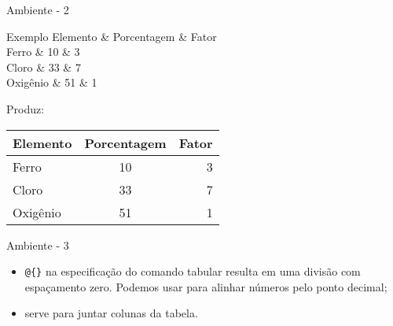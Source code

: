 \begin{frame}{Ambiente  - 2}
	\begin{Codigo}{Exemplo}
			\n
			Elemento   \&  Porcentagem \& Fator \string\\ \n
			\string\hline\string\hline \n
			Ferro      \&  10          \& 3     \string\\ \string\hline \n
			Cloro      \&  33          \& 7     \string\\ \string\hline \n
			Oxigênio   \&  51          \& 1     \string\\ \string\hline \n
		\LCmdArg{end}{tabular}
	\end{Codigo}

\pause
	Produz:
	
	\begin{Resultado}{}
		\begin{center}
			\begin{tabular}{p{3cm}|c|r}
				\hline
				Elemento    &  Porcentagem  & Fator \\ \hline \hline
				Ferro   &  10   & 3     \\ \hline
				Cloro   &  33   & 7     \\ \hline
				Oxigênio  &  51   & 1 \\ \hline
			\end{tabular}		
		\end{center}
	\end{Resultado}

\end{frame}

\begin{frame}{Ambiente  - 3}
	\begin{itemize}
		\item \texttt{@\{\}} na especificação do comando tabular resulta em uma divisão com espaçamento zero. Podemos usar para alinhar números pelo ponto decimal;
		\pause
		\item {} serve para juntar colunas da tabela.
	\end{itemize}
\end{frame}

